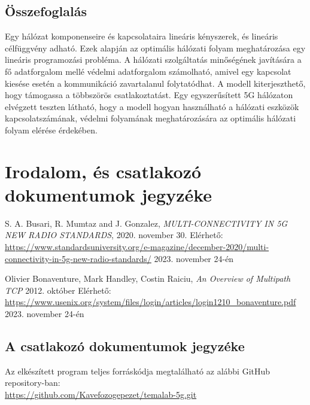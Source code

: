 \documentclass[a4paper,oneside]{article}
\begin{document}
\newpage

\subsection{Összefoglalás}
\label{sec:osszefoglalas}

Egy hálózat komponenseire és kapcsolataira lineáris kényszerek, és lineáris célfüggvény adható.
Ezek alapján az optimális hálózati folyam meghatározása egy lineáris programozási probléma.
A hálózati szolgáltatás minőségének javítására a fő adatforgalom mellé
védelmi adatforgalom számolható, amivel egy kapcsolat kiesése esetén a kommunikáció zavartalanul folytatódhat.
A modell kiterjeszthető, hogy támogassa a többszörös csatlakoztatást.
Egy egyszerűsített 5G hálózaton elvégzett teszten látható, hogy a modell hogyan használható
a hálózati eszközök kapcsolatszámának, védelmi folyamának meghatározására az optimális
hálózati folyam elérése érdekében.
 
\section{Irodalom, és csatlakozó dokumentumok jegyzéke}
\label{sec:irod-es-csatl}

\begin{thebibliography}{9}
\label{sec:tanulm-irod-jegyz}

 S. A. Busari, R. Mumtaz and J. Gonzalez,
\emph{MULTI-CONNECTIVITY IN 5G NEW RADIO STANDARDS},
2020. november 30.
Elérhető: \url{https://www.standardsuniversity.org/e-magazine/december-2020/multi-connectivity-in-5g-new-radio-standards/}
2023. november 24-én

 Olivier Bonaventure, Mark Handley, Costin Raiciu,
\emph{An Overview of Multipath TCP}
2012. október
Elérhető: \url{https://www.usenix.org/system/files/login/articles/login1210_bonaventure.pdf}
2023. november 24-én

\end{thebibliography}

\subsection{A csatlakozó dokumentumok jegyzéke}
\label{sec:csat-irod}

Az elkészített program teljes forráskódja megtalálható az alábbi GitHub repository-ban:\\
\url{https://github.com/Kavefozogepezet/temalab-5g.git}
\end{document}

